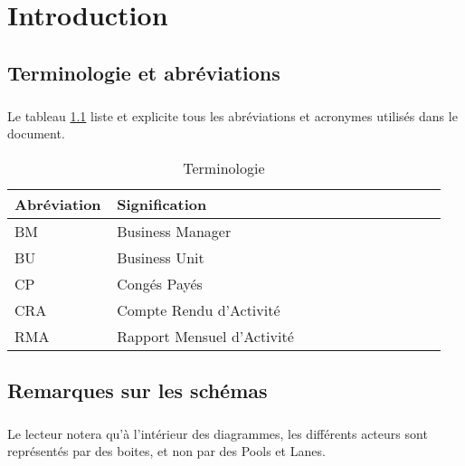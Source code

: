 \documentclass[12pt]{scrreprt}
\author{Direction des opérations}
\date{Avril 2016}
\begin{document}



\chapter{Introduction}

\section{Terminologie et abréviations}
\paragraph{} Le tableau \ref{abbr} liste et explicite tous les abréviations et acronymes utilisés dans le document.
\begin{table}
\begin{center}
    \begin{longtable}{|p{0.2\linewidth}|p{0.75\linewidth}|}
    \hline  %
    \rowcolor[gray]{.8}
    Abréviation & Signification\\
    \hline
    BM & Business Manager\\
    \hline
    BU & Business Unit \\
    \hline
    CP & Congés Payés\\
    \hline
    CRA & Compte Rendu d'Activité\\
    \hline
    RMA & Rapport Mensuel d'Activité\\
    \hline
    \end{longtable}
    \caption{Terminologie}
    \label{abbr}
\end{center}
\end{table}

\section{Remarques sur les schémas}
\paragraph{} Le lecteur notera qu'à l'intérieur des diagrammes, les différents acteurs sont représentés par des boites, et non par des Pools et Lanes.
\end{document}
